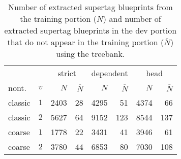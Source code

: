 \documentclass[../../document.tex]{subfiles}
\begin{document}
    \begin{table}
        \caption{\label{tbl:experiments:dptb:size}
        Number of extracted supertag blueprints from the training portion ($N$) and number of extracted supertag blueprints in the dev portion that do not appear in the training portion ($\overline{N}$) using the \dptb{} treebank.
        }
        \centering
        \setlength{\tabcolsep}{4pt}
        \vspace{.2cm}
        \begin{tabular}{lc|rr|rr|rr}
            \toprule
             &        & \multicolumn{2}{c|}{strict} & \multicolumn{2}{c|}{dependent} & \multicolumn{2}{c}{head}  \\
 nont.   &\(v\)   & $N$ & $\overline{N}$ & $N$ & $\overline{N}$ & $N$ & $\overline{N}$ \\ \hline
  classic & \(1\)  & 2403 &  28 &  4295 &  51 &  4374 &  66  \\
  classic & \(2\)  & 5627 &  64 &  9152 & 123 &  8544 & 137  \\
  coarse  & \(1\)  & 1778 &  22 &  3431 &  41 &  3946 &  61  \\
  coarse  & \(2\)  & 3780 &  44 &  6853 &  80 &  7030 & 108  \\
    \bottomrule
        \end{tabular}
    \end{table}
\end{document}
